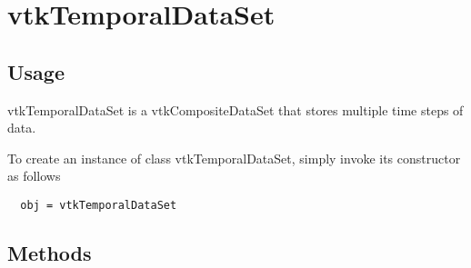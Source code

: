 \section{vtkTemporalDataSet}

\subsection{Usage}

 vtkTemporalDataSet is a vtkCompositeDataSet that stores
 multiple time steps of data. 

To create an instance of class vtkTemporalDataSet, simply
invoke its constructor as follows
\begin{verbatim}
  obj = vtkTemporalDataSet
\end{verbatim}
\subsection{Methods}

